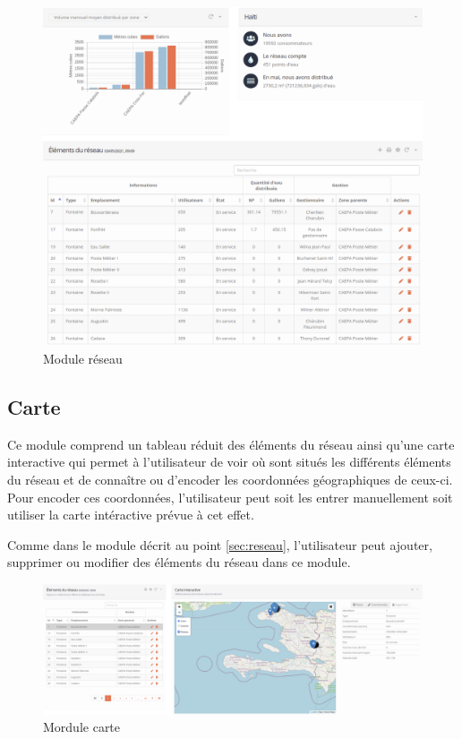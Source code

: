 \documentclass{EPL-master-thesis-covers-FR}
\begin{document}
				\begin{figure}[H]
					\centering
					\includegraphics[width=1\textwidth]{images/water_elem}
					\caption{Module réseau}
				\end{figure}
				
\newpage
				
			\subsection{Carte}
				Ce module comprend un tableau réduit des éléments du réseau ainsi qu'une carte interactive qui permet à l'utilisateur de voir où sont situés les différents éléments du réseau et de connaître ou d'encoder les coordonnées géographiques de ceux-ci. Pour encoder ces coordonnées, l'utilisateur peut soit les entrer manuellement soit utiliser la carte intéractive prévue à cet effet. 
			
			Comme dans le module décrit au point \ref{sec:reseau}, l'utilisateur peut ajouter, supprimer ou modifier des éléments du réseau dans ce module.
			
				\begin{figure}[H]
					\centering
					\includegraphics[width=1\textwidth]{images/map}
					\caption{Mordule carte}
				\end{figure}
				
\end{document}
